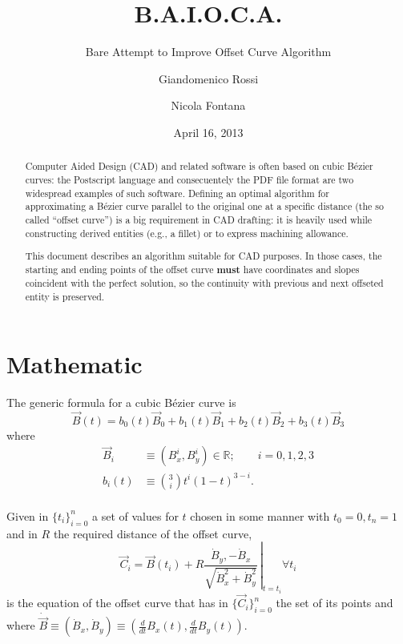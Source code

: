 \documentclass{scrartcl}
\title{B.A.I.O.C.A.}
\subtitle{Bare Attempt to Improve Offset Curve Algorithm}
\author{Giandomenico Rossi \and Nicola Fontana}
\date{April 16, 2013}
\newcommand\V[1]{\vec{#1}}
\newcommand\D[1]{\dot{#1}}
\newcommand\DV[1]{\D{\V{#1}}}
\begin{document}
\maketitle

\begin{abstract}
Computer Aided Design (CAD) and related software is often based on cubic
Bézier curves: the Postscript language and consecuentely the PDF file
format are two widespread examples of such software. Defining an optimal
algorithm for approximating a Bézier curve parallel to the original one
at a specific distance (the so called ``offset curve'') is a big
requirement in CAD drafting: it is heavily used while constructing
derived entities (e.g., a fillet) or to express machining allowance.

This document describes an algorithm suitable for CAD purposes. In those
cases, the starting and ending points of the offset curve \textbf{must}
have coordinates and slopes coincident with the perfect solution, so the
continuity with previous and next offseted entity is preserved.
\end{abstract}

\section{Mathematic}

The generic formula for a cubic Bézier curve is
\begin{equation*}
\V{B}(t) = b_0(t)\V{B}_0 + b_1(t)\V{B}_1 + b_2(t)\V{B}_2 + b_3(t)\V{B}_3
\end{equation*}
where
\begin{equation*}
\begin{split}
\V{B}_i &\equiv ( B^i_x, B^i_y ) \in \mathbb{R}; \qquad i = 0,1,2,3 \\
b_i(t)  &\equiv \binom{3}{i} t^i (1-t)^{3-i}. \\
\end{split}
\end{equation*}

Given in $\{t_i\}_{i=0}^n$ a set of values for $t$ chosen in some
manner with $t_0=0, t_n=1$ and in $R$ the required distance of the offset
curve,
\begin{equation}\label{eq:Ci}
\V{C}_i = \V{B}(t_i) + R \left.
\frac{\D{B}_y, -\D{B}_x}{\sqrt{\D{B}_x^2 + \D{B}_y^2}}
    \,\right|_{t=t_i} \forall t_i
\end{equation}
is the equation of the offset curve that has in $\{\V{C}_i\}_{i=0}^n$ the
set of its points and where $\DV{B} \equiv ( \D{B}_x, \D{B}_y ) \equiv
\left( \frac{d}{dt} B_x(t), \frac{d}{dt} B_y(t) \right)$.
\end{document}
